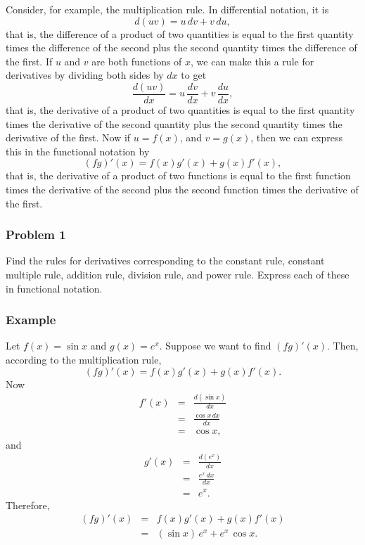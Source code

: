 \documentclass[twoside,openright]{article}
\begin{document}
Consider, for example, the multiplication rule.  In differential notation, it is
$$d(uv) = u\,dv + v\,du,$$
that is, the difference of a product of two quantities is equal to the
first quantity times the difference of the second plus the second
quantity times the difference of the first.  If $u$ and $v$ are both
functions of $x$, we can make this a rule for derivatives by dividing
both sides by $dx$ to get
$$\frac{d(uv)}{dx} = u\,\frac{dv}{dx} + v\,\frac{du}{dx},$$
that is, the derivative of a product of two quantities is equal to the
first quantity times the derivative of the second quantity plus the
second quantity times the derivative of the first.  Now if $u=f(x)$,
and $v=g(x)$, then we can express this in the functional notation by
$$(fg)'(x) = f(x)g'(x) +g(x)f'(x),$$
that is, the derivative of a product of two functions is equal to the
first function times the derivative of the second plus the second
function times the derivative of the first.

\subsubsection*{Problem 1} Find the rules for derivatives
corresponding to the constant rule, constant multiple rule, addition
rule, division rule, and power rule.  Express each of these in
functional notation.

\subsubsection*{Example} Let $f(x) = \sin x$ and $g(x) = e^x$.
Suppose we want to find $(fg)'(x).$ Then, according to the
multiplication rule,
$$(fg)'(x)=  f(x)g'(x) + g(x)f'(x).$$
Now
\setlength{\jot}{1.5ex}
\begin{eqnarray*}
  f'(x) & = & \frac{d(\sin x)}{dx}\\
        & = & \frac{\cos x\,dx}{dx}\\
        & = & \cos x,
\end{eqnarray*}
and 
\begin{eqnarray*}
  g'(x) & = & \frac{d(e^x)}{dx}\\
        & = & \frac{e^x\,dx}{dx}\\
        & = & e^x.
\end{eqnarray*}
Therefore,
\begin{eqnarray*}
  (fg)'(x) & = & f(x)g'(x) + g(x)f'(x)\\
           & = & (\sin x)\, e^x + e^x \,\cos x.
\end{eqnarray*}
\end{document}
